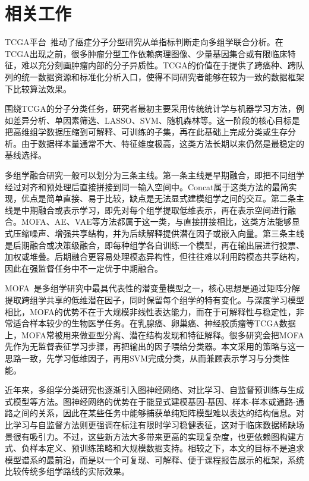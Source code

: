 \section{相关工作}

TCGA平台~\cite{tcga2012}推动了癌症分子分型研究从单指标判断走向多组学联合分析。在TCGA出现之前，很多肿瘤分型工作依赖病理图像、少量基因集合或有限临床特征，难以充分刻画肿瘤内部的分子异质性。TCGA的价值在于提供了跨癌种、跨队列的统一数据资源和标准化分析入口，使得不同研究者能够在较为一致的数据框架下比较算法效果。

围绕TCGA的分子分类任务，研究者最初主要采用传统统计学与机器学习方法，例如差异分析、单因素筛选、LASSO、SVM、随机森林等。这一阶段的核心目标是把高维组学数据压缩到可解释、可训练的子集，再在此基础上完成分类或生存分析。由于数据样本量通常不大、特征维度极高，这类方法长期以来仍然是最稳定的基线选择。

多组学融合研究一般可以划分为三条主线。第一条主线是早期融合，即把不同组学经过对齐和预处理后直接拼接到同一输入空间中。Concat属于这类方法的最简实现，优点是简单直接、易于比较，缺点是无法显式建模组学之间的交互。第二条主线是中期融合或表示学习，即先对每个组学提取低维表示，再在表示空间进行融合。MOFA、AE、VAE等方法都属于这一类，与直接拼接相比，这类方法能够显式压缩噪声、增强共享结构，并为后续解释提供潜在因子或嵌入向量。第三条主线是后期融合或决策级融合，即每种组学各自训练一个模型，再在输出层进行投票、加权或堆叠。后期融合更容易处理模态异构性，但往往难以利用跨模态共享结构，因此在强监督任务中不一定优于中期融合。

MOFA~\cite{mofa2018}是多组学研究中最具代表性的潜变量模型之一，核心思想是通过矩阵分解提取跨组学共享的低维潜在因子，同时保留每个组学的特有变化。与深度学习模型相比，MOFA的优势不在于大规模非线性表达能力，而在于可解释性与稳定性，非常适合样本较少的生物医学任务。在乳腺癌、卵巢癌、神经胶质瘤等TCGA数据上，MOFA常被用来做亚型分离、潜在结构发现和特征解释。很多研究会把MOFA先作为无监督表征学习步骤，再把输出的因子喂给分类器。本文采用的策略与这一思路一致，先学习低维因子，再用SVM完成分类，从而兼顾表示学习与分类性能。

近年来，多组学分类研究也逐渐引入图神经网络、对比学习、自监督预训练与生成式模型等方法。图神经网络的优势在于能显式建模基因-基因、样本-样本或通路-通路之间的关系，因此在某些任务中能够捕获单纯矩阵模型难以表达的结构信息。对比学习与自监督方法则更强调在标注有限时学习稳健表征，这对于临床数据稀缺场景很有吸引力。不过，这些新方法大多带来更高的实现复杂度，也更依赖图构建方式、负样本定义、预训练策略和大规模数据支持。相较之下，本文的目标不是追求模型谱系的最前沿，而是以一个可复现、可解释、便于课程报告展示的框架，系统比较传统多组学路线的实际效果。
